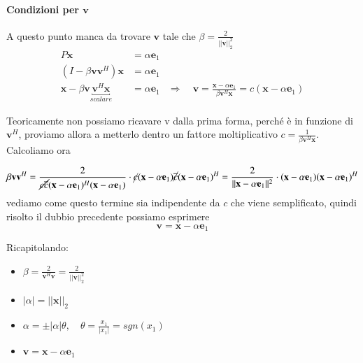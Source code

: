 \paragraph{Condizioni per $\mathbf{v}$}
A questo punto manca da trovare $\mathbf{v}$ tale che $\beta = \frac{2}{|| \mathbf{v} ||^2_2}$
\[\begin{array}{lll}
 P\mathbf{x} &= \alpha \mathbf{e}_1 \\
 (I - \beta \mathbf{v}\mathbf{v}^{H}) \mathbf{x} &= \alpha \mathbf{e}_1 \\
 \mathbf{x} - \beta \mathbf{v} \underbracket{\mathbf{v}^{H}\mathbf{x}}_{scalare} &= \alpha \mathbf{e}_1 &
 \Rightarrow \quad \mathbf{v} = \frac{\mathbf{x} - \alpha \mathbf{e}_1}{\beta \mathbf{v}^{H}\mathbf{x}} = c(\mathbf{x} - \alpha \mathbf{e}_1)
\end{array}\]

Teoricamente non possiamo ricavare v dalla prima forma, perch\'e \`e in
funzione di $\mathbf{v}^{H}$, proviamo allora a metterlo dentro un fattore
moltiplicativo $ c = \frac{1}{\beta \mathbf{v}^{H}\mathbf{x}}$. Calcoliamo ora 

$$ \beta \mathbf{v}\mathbf{v}^{H} = 
\frac{2}{\cancel{c \overline{c}} (\mathbf{x} - \alpha \mathbf{e}_1)^{H} (\mathbf{x} - \alpha \mathbf{e}_1)}
\cdot \cancel{c} (\mathbf{x} - \alpha \mathbf{e}_1) \cancel{\overline{c}} (\mathbf{x} - \alpha \mathbf{e}_1)^{H} =
\frac{2}{|| \mathbf{x} - \alpha \mathbf{e}_1||^{2}} \cdot (\mathbf{x} - \alpha \mathbf{e}_1) (\mathbf{x} - \alpha \mathbf{e}_1)^{H}$$
vediamo come questo termine sia indipendente da $c$ che viene semplificato,
quindi risolto il dubbio precedente possiamo esprimere
$$ \mathbf{v} = \mathbf{x} - \alpha \mathbf{e}_1 $$

Ricapitolando:
\begin{itemize}
 \item $ \beta = \frac{2}{\mathbf{v}^{H}\mathbf{v}} = \frac{2}{||\mathbf{v}||^{2}_{2}}$
 \item $|\alpha| = || \mathbf{x}||_{2}$
 \item $ \alpha = \pm |\alpha|\theta ,  \quad \theta = \frac{x_1}{|x_1|} = sgn(x_1)$
 \item $\mathbf{v} = \mathbf{x} - \alpha \mathbf{e}_1 $
\end{itemize}


